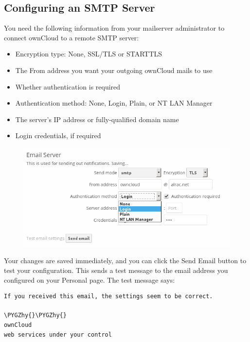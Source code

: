 \documentclass[letterpaper,10pt,english]{sphinxmanual}
\def\PYGZhy{\char`\-}
\begin{document}
\subsection{Configuring an SMTP Server}
\label{configuration_server/email_configuration:configuring-an-smtp-server}
You need the following information from your mailserver administrator to
connect ownCloud to a remote SMTP server:
\begin{itemize}
\item {} 
Encryption type: None, SSL/TLS or STARTTLS

\item {} 
The From address you want your outgoing ownCloud mails to use

\item {} 
Whether authentication is required

\item {} 
Authentication method: None, Login, Plain, or NT LAN Manager

\item {} 
The server's IP address or fully-qualified domain name

\item {} 
Login credentials, if required

\end{itemize}
\begin{figure}[htbp]
\centering

\includegraphics{smtp-config-smtp.png}
\end{figure}

Your changes are saved immediately, and you can click the Send Email button to
test your configuration. This sends a test message to the email address you
configured on your Personal page. The test message says:

\begin{Verbatim}[commandchars=\\\{\}]
If you received this email, the settings seem to be correct.

\PYGZhy{}\PYGZhy{}
ownCloud
web services under your control
\end{Verbatim}
\end{document}
